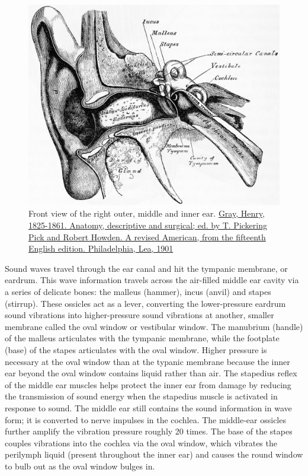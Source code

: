 \begin{figure}

{\centering \includegraphics[width=0.7\linewidth]{./figures/auditory/GrayEar} 

}

\caption{Front view of the right outer, middle and inner ear. \href{https://archive.org/details/anatomydescripti00grayuoft/page/n6/mode/2up}{Gray, Henry, 1825-1861. Anatomy, descriptive and surgical; ed. by T. Pickering Pick and Robert Howden. A revised American, from the fifteenth English edition. Philadelphia, Lea, 1901}}\label{fig:rightear}
\end{figure}

Sound waves travel through the ear canal and hit the tympanic membrane, or eardrum. This wave information travels across the air-filled middle ear cavity via a series of delicate bones: the malleus (hammer), incus (anvil) and stapes (stirrup). These ossicles act as a lever, converting the lower-pressure eardrum sound vibrations into higher-pressure sound vibrations at another, smaller membrane called the oval window or vestibular window. The manubrium (handle) of the malleus articulates with the tympanic membrane, while the footplate (base) of the stapes articulates with the oval window. Higher pressure is necessary at the oval window than at the typanic membrane because the inner ear beyond the oval window contains liquid rather than air. The stapedius reflex of the middle ear muscles helps protect the inner ear from damage by reducing the transmission of sound energy when the stapedius muscle is activated in response to sound. The middle ear still contains the sound information in wave form; it is converted to nerve impulses in the cochlea.
The middle-ear ossicles further amplify the vibration pressure roughly 20 times. The base of the stapes couples vibrations into the cochlea via the oval window, which vibrates the perilymph liquid (present throughout the inner ear) and causes the round window to bulb out as the oval window bulges in.

